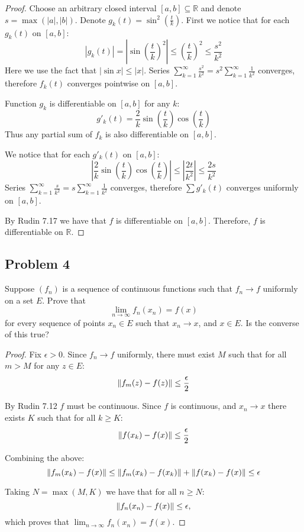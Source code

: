 \documentclass{article}
\newcommand{\R}{\mathbb{R}}
\DeclarePairedDelimiter{\norm}{\lVert}{\rVert}
\begin{document}
\begin{proof}

Choose an arbitrary closed interval $[a,b] \subseteq \R$ and denote $s = \max(|a|,|b|)$.
Denote $g_k(t) = \sin^2 \left( \frac{t}{k} \right)$. First we notice that for each $g_k(t)$ on $[a,b]$:
\[ |g_k(t)| = \left| \sin \left( \frac{t}{k} \right)^2 \right| \leq \left( \frac{t}{k} \right)^2 \leq \frac{s^2}{k^2} \]
Here we use the fact that $|\sin x| \leq |x|$.
Series $\sum_{k=1}^{\infty} \frac{s^2}{k^2} = s^2 \sum_{k=1}^{\infty} \frac{1}{k^2}$ converges, therefore $f_k(t)$ converges pointwise on $[a,b]$.

Function $g_k$ is differentiable on $[a,b]$ for any $k$:
\[ g'_k(t) = \frac{2}{k} \sin \left( \frac{t}{k} \right) \cos \left( \frac{t}{k} \right) \]
Thus any partial sum of $f_k$ is also differentiable on $[a,b]$.

We notice that for each $g'_k(t)$ on $[a,b]$:
\[
\left| \frac{2}{k} \sin \left( \frac{t}{k} \right) \cos \left( \frac{t}{k} \right) \right| \leq \left| \frac{2t}{k^2} \right| \leq \frac{2s}{k^2}
\]
Series $\sum_{k=1}^{\infty} \frac{s}{k^2} = s \sum_{k=1}^{\infty} \frac{1}{k^2}$ converges, therefore $\sum g'_k(t)$ converges uniformly on $[a,b]$.

By Rudin 7.17 we have that $f$ is differentiable on $[a,b]$. Therefore, $f$ is differentiable on $\R$.

\end{proof}


\subsection*{Problem 4}

\begin{tcolorbox}
Suppose $(f_n)$ is a sequence of continuous functions such that $f_n \to f$ uniformly on a set $E$. Prove that
\[ \lim_{n \to \infty} f_n(x_n) = f(x) \]
for every sequence of points $x_n \in E$ such that $x_n \to x$, and $x \in E$. Is the converse of this true?
\end{tcolorbox}

\begin{proof}

Fix $\epsilon>0$. Since $f_n \to f$ uniformly, there must exist $M$ such that for all $m>M$ for any $z \in E$:
\[ \norm*{ f_m(z) - f(z) } \leq \frac{\epsilon}{2} \]

By Rudin 7.12 $f$ must be continuous. Since $f$ is continuous, and $x_n \to x$ there exists $K$ such that for all $k \geq K$:
\[ \norm*{ f(x_k) - f(x) } \leq \frac{\epsilon}{2} \]

Combining the above:
\[ \norm*{ f_m(x_k) - f(x) } \leq \norm*{ f_m(x_k) - f(x_k) } + \norm*{ f(x_k) - f(x) } \leq \epsilon \]

Taking $N = \max(M,K)$ we have that for all $n \geq N$:
\[ \norm*{ f_n(x_n) - f(x) } \leq \epsilon, \]
which proves that $\lim_{n \to \infty} f_n(x_n) = f(x)$.

\end{proof}
\end{document}
